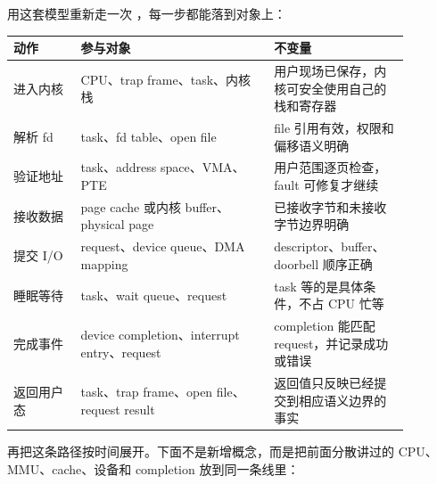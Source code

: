 用这套模型重新走一次 ，每一步都能落到对象上：

\begin{longtable}{p{0.15\linewidth}p{0.43\linewidth}p{0.3\linewidth}}
\toprule
动作 & 参与对象 & 不变量 \\
\midrule
进入内核 & CPU、trap frame、task、内核栈 & 用户现场已保存，内核可安全使用自己的栈和寄存器 \\
解析 fd & task、fd table、open file & file 引用有效，权限和偏移语义明确 \\
验证地址 & task、address space、VMA、PTE & 用户范围逐页检查，fault 可修复才继续 \\
接收数据 & page cache 或内核 buffer、physical page & 已接收字节和未接收字节边界明确 \\
提交 I/O & request、device queue、DMA mapping & descriptor、buffer、doorbell 顺序正确 \\
睡眠等待 & task、wait queue、request & task 等的是具体条件，不占 CPU 忙等 \\
完成事件 & device completion、interrupt entry、request & completion 能匹配 request，并记录成功或错误 \\
返回用户态 & task、trap frame、open file、request result & 返回值只反映已经提交到相应语义边界的事实 \\
\bottomrule
\end{longtable}

再把这条路径按时间展开。下面不是新增概念，而是把前面分散讲过的 CPU、MMU、cache、设备和 completion 放到同一条线里：

